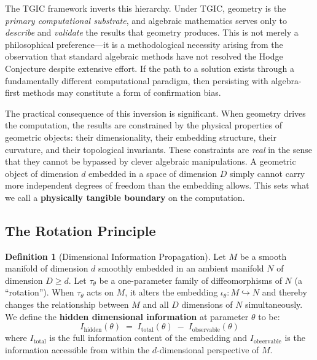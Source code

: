 \documentclass[11pt,a4paper]{article}
\theoremstyle{definition}
\newtheorem{definition}{Definition}[section]
\theoremstyle{plain}
\begin{document}
The TGIC framework inverts this hierarchy. Under TGIC, geometry is the \emph{primary computational substrate}, and algebraic mathematics serves only to \emph{describe} and \emph{validate} the results that geometry produces. This is not merely a philosophical preference---it is a methodological necessity arising from the observation that standard algebraic methods have not resolved the Hodge Conjecture despite extensive effort. If the path to a solution exists through a fundamentally different computational paradigm, then persisting with algebra-first methods may constitute a form of confirmation bias.

The practical consequence of this inversion is significant. When geometry drives the computation, the results are constrained by the physical properties of geometric objects: their dimensionality, their embedding structure, their curvature, and their topological invariants. These constraints are \emph{real} in the sense that they cannot be bypassed by clever algebraic manipulations. A geometric object of dimension $d$ embedded in a space of dimension $D$ simply cannot carry more independent degrees of freedom than the embedding allows. This sets what we call a \textbf{physically tangible boundary} on the computation.

\subsection{The Rotation Principle}

\begin{definition}[Dimensional Information Propagation]\label{def:dip}
Let $M$ be a smooth manifold of dimension $d$ smoothly embedded in an ambient manifold $N$ of dimension $D \geq d$. Let $\tau_\theta$ be a one-parameter family of diffeomorphisms of $N$ (a ``rotation''). When $\tau_\theta$ acts on $M$, it alters the embedding $\iota_\theta: M \hookrightarrow N$ and thereby changes the relationship between $M$ and all $D$ dimensions of $N$ simultaneously. We define the \textbf{hidden dimensional information} at parameter $\theta$ to be:
\begin{equation}\label{eq:hidden-info}
I_{\mathrm{hidden}}(\theta) \;=\; I_{\mathrm{total}}(\theta) \;-\; I_{\mathrm{observable}}(\theta)
\end{equation}
where $I_{\mathrm{total}}$ is the full information content of the embedding and $I_{\mathrm{observable}}$ is the information accessible from within the $d$-dimensional perspective of $M$.
\end{definition}
\end{document}
